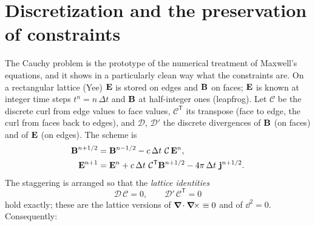 \section{Discretization and the preservation of constraints}\label{sec:mx-num}

The Cauchy problem is the prototype of the numerical treatment of
Maxwell's equations, and it shows in a particularly clean way what the
constraints are.  On a rectangular lattice (Yee) $\mathbf{E}$ is stored on edges
and $\mathbf{B}$ on faces; $\mathbf{E}$ is known at integer time steps $t^n=n\,\Delta t$ and
$\mathbf{B}$ at half-integer ones (leapfrog).  Let $\mathcal C$ be the discrete
curl from edge values to face values, $\mathcal C^{\mathsf T}$ its transpose
(face to edge, the curl from faces back to edges), and $\mathcal D$, $\mathcal D'$
the discrete divergences of $\mathbf{B}$ (on faces) and of $\mathbf{E}$ (on edges).
The scheme is
\begin{equation}\label{eq:yee}
\begin{aligned}
\mathbf{B}^{n+1/2}&=\mathbf{B}^{n-1/2}-c\,\Delta t\ \mathcal C\,\mathbf{E}^n,\\
\mathbf{E}^{n+1}&=\mathbf{E}^n+c\,\Delta t\ \mathcal C^{\mathsf T}\mathbf{B}^{n+1/2}-4\pi\,\Delta t\ \mathbf{j}^{n+1/2}.
\end{aligned}
\end{equation}
The staggering is arranged so that the \emph{lattice identities}
\begin{equation}
\mathcal D\,\mathcal C=0,\qquad \mathcal D'\,\mathcal C^{\mathsf T}=0
\end{equation}
hold exactly; these are the lattice versions of $\boldsymbol{\nabla}\!\cdot\boldsymbol{\nabla}\!\times\equiv0$ and
of $\dd^2=0$.  Consequently:
